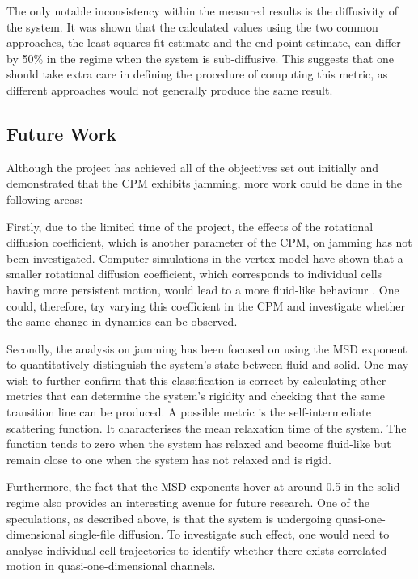 \documentclass[a4paper,12pt]{article}
\begin{document}
The only notable inconsistency within the measured results is the diffusivity of the system. It was shown that the calculated values using the two common approaches, the least squares fit estimate and the end point estimate, can differ by 50\% in the regime when the system is sub-diffusive. This suggests that one should take extra care in defining the procedure of computing this metric, as different approaches would not generally produce the same result.  


\subsection{Future Work}
Although the project has achieved all of the objectives set out initially and demonstrated that the CPM exhibits jamming, more work could be done in the following areas: 

Firstly, due to the limited time of the project, the effects of the rotational diffusion coefficient, which is another parameter of the CPM, on jamming has not been investigated. Computer simulations in the vertex model have shown that a smaller rotational diffusion coefficient, which corresponds to individual cells having more persistent motion, would lead to a more fluid-like behaviour \cite{bi2015motility}. One could, therefore, try varying this coefficient in the CPM and investigate whether the same change in dynamics can be observed. 

Secondly, the analysis on jamming has been focused on using the MSD exponent to quantitatively distinguish the system's state between fluid and solid. One may wish to further confirm that this classification is correct by calculating other metrics that can determine the system's rigidity and checking that the same transition line can be produced.  A possible metric is the self-intermediate scattering function\cite{hove1954}. It characterises the mean relaxation time of the system. The function tends to zero when the system has relaxed and become fluid-like but remain close to one when the system has not relaxed and is rigid. 

Furthermore, the fact that the MSD exponents hover at around 0.5 in the solid regime also provides an interesting avenue for future research. One of the speculations, as described above, is that the system is undergoing quasi-one-dimensional single-file diffusion. To investigate such effect, one would need to analyse individual cell trajectories to identify whether there exists correlated motion in quasi-one-dimensional channels. 
\end{document}

